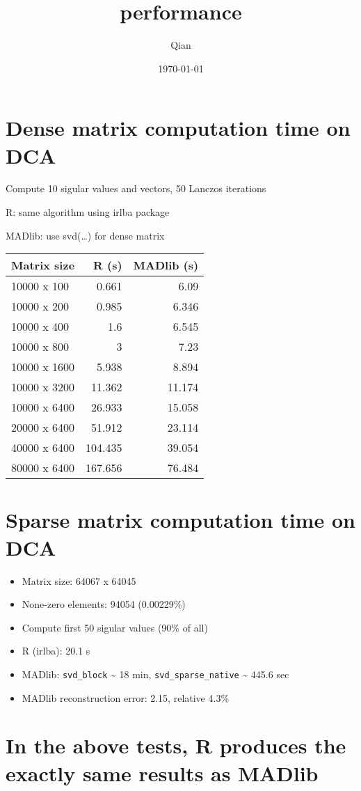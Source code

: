 \documentclass[11pt]{article}
\title{performance}
\author{Qian}
\date{\today}
\begin{document}
\maketitle

\setcounter{tocdepth}{3}
\tableofcontents
\vspace*{1cm}

\section{Dense matrix computation time on DCA}
\label{sec-1}


Compute 10 sigular values and vectors, 50 Lanczos iterations

R: same algorithm using irlba package

MADlib: use svd(\ldots{}) for dense matrix


\begin{center}
\begin{tabular}{lrr}
 Matrix size   &    R (s)  &  MADlib (s)  \\
\hline
 10000 x 100   &    0.661  &        6.09  \\
 10000 x 200   &    0.985  &       6.346  \\
 10000 x 400   &      1.6  &       6.545  \\
 10000 x 800   &        3  &        7.23  \\
 10000 x 1600  &    5.938  &       8.894  \\
 10000 x 3200  &   11.362  &      11.174  \\
 10000 x 6400  &   26.933  &      15.058  \\
 20000 x 6400  &   51.912  &      23.114  \\
 40000 x 6400  &  104.435  &      39.054  \\
 80000 x 6400  &  167.656  &      76.484  \\
\hline
\end{tabular}
\end{center}
\section{Sparse matrix computation time on DCA}
\label{sec-2}

\begin{itemize}
\item Matrix size: 64067 x 64045
\item None-zero elements: 94054 (0.00229\%)
\item Compute first 50 sigular values (90\% of all)
\item R (irlba): 20.1 s
\item MADlib: \texttt{svd\_block} \~{} 18 min, \texttt{svd\_sparse\_native} \~{} 445.6 sec
\item MADlib reconstruction error: 2.15, relative 4.3\%
\end{itemize}
\section{In the above tests, R produces the exactly same results as MADlib}
\label{sec-3}
\end{document}
